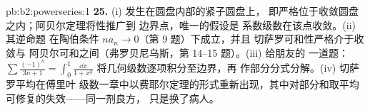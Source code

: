 \begin{solution}{pb:b2:powerseries:1}
\textbf{25.} (i) 发生在圆盘内部的紧子圆盘上，
即严格位于收敛圆盘之内；阿贝尔定理将性推广到
边界点，唯一的假设是
系数级数在该点收敛。(ii) 其逆命题
在陶伯条件 $na_n \to 0$（第 9 题）下成立，并且
切萨罗可和性严格介于收敛与
阿贝尔可和之间（弗罗贝尼乌斯，第 14--15 题）。(iii) 给朋友的
一道题：$\sum\frac{(-1)^n}{3n+1} = \int_0^1\frac{\dd x}{1+x^3}$
将几何级数逐项积分至边界，再
作部分分式分解。(iv) 切萨罗平均在傅里叶
级数一章中以费耶尔定理的形式重新出现，其中对部分和取平均
可修复的失效——同一剂良方，
只是换了病人。
\end{solution}
